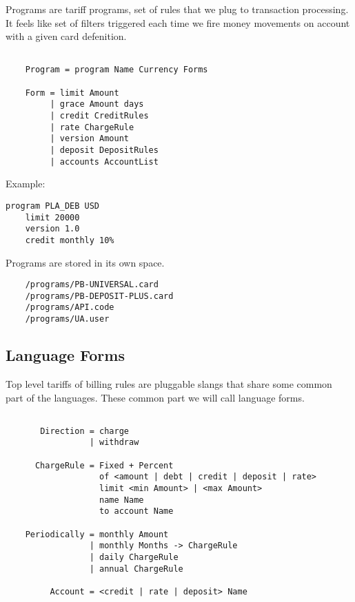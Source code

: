 Programs are tariff programs, set of rules that we plug to transaction processing.
It feels like set of filters triggered each time we fire money
movements on account with a given card defenition.

\vspace{1\baselineskip}
\begin{lstlisting}[caption=BNF]

    Program = program Name Currency Forms

    Form = limit Amount
         | grace Amount days
         | credit CreditRules
         | rate ChargeRule
         | version Amount
         | deposit DepositRules
         | accounts AccountList
\end{lstlisting}
\vspace{1\baselineskip}

Example:

\vspace{1\baselineskip}
\begin{lstlisting}[caption=credit.card]
    program PLA_DEB USD
    limit 20000
    version 1.0
    credit monthly 10%
\end{lstlisting}
\vspace{1\baselineskip}


Programs are stored in its own space.

\vspace{1\baselineskip}
\begin{lstlisting}
    /programs/PB-UNIVERSAL.card
    /programs/PB-DEPOSIT-PLUS.card
    /programs/API.code
    /programs/UA.user
\end{lstlisting}
\vspace{1\baselineskip}

\newpage
\subsection{Language Forms}

Top level tariffs of billing rules are pluggable slangs that
share some common part of the languages. These common part we will
call language forms.

\vspace{1\baselineskip}
\begin{lstlisting}[caption=BNF]

       Direction = charge 
                 | withdraw

      ChargeRule = Fixed + Percent
                   of <amount | debt | credit | deposit | rate>
                   limit <min Amount> | <max Amount>
                   name Name
                   to account Name

    Periodically = monthly Amount 
                 | monthly Months -> ChargeRule
                 | daily ChargeRule
                 | annual ChargeRule

         Account = <credit | rate | deposit> Name

\end{lstlisting}
\vspace{1\baselineskip}

